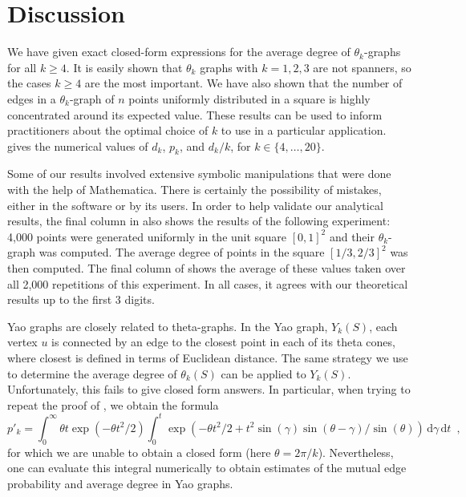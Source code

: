 \documentclass{patmorin}
\begin{document}
\section{Discussion}

We have given exact closed-form expressions for the average degree of
$\theta_k$-graphs for all $k\ge 4$.  It is easily shown that $\theta_k$
graphs with $k=1,2,3$ are not spanners, so the cases $k\ge 4$ are
the most important.  We have also shown that the number of edges in
a $\theta_k$-graph of $n$ points uniformly distributed in a square is
highly concentrated around its expected value.  These results can be
used to inform practitioners about the optimal choice of $k$ to use in
a particular application.   gives the numerical values
of $d_k$, $p_k$, and $d_k/k$, for $k\in\{4,\ldots,20\}$.


Some of our results involved extensive symbolic manipulations that were
done with the help of Mathematica.  There is certainly the possibility
of mistakes, either in the software or by its users.  In order to help
validate our analytical results, the final column in  also
shows the results of the following experiment: 4,000 points were generated
uniformly in the unit square $[0,1]^2$ and their $\theta_k$-graph was
computed.  The average degree of points in the square $[1/3,2/3]^2$ was
then computed.  The final column of  shows the average of
these values taken over all 2,000 repetitions of this experiment.  In all
cases, it agrees with our theoretical results up to the first 3 digits.

Yao graphs \cite{flinchbaugh.jones:strong,yao:on} are closely related to
theta-graphs.  In the Yao graph, $Y_k(S)$, each vertex $u$ is connected by
an edge to the closest point in each of its  theta cones, where closest
is defined in terms of Euclidean distance.  The same strategy we use to
determine the average degree of $\theta_k(S)$ can be applied to $Y_k(S)$.
Unfortunately, this fails to give closed form answers.  In particular,
when trying to repeat the proof of , we obtain the formula
\[
  p'_k = \int_0^\infty \theta t\exp(-\theta t^2/2) \int_0^t \exp(-\theta t^2/2+t^2\sin(\gamma)\sin(\theta-\gamma)/\sin(\theta))\,\mathrm d\gamma\, \mathrm dt \enspace ,
\]
for which we are unable to obtain a closed form (here $\theta=2\pi/k$).
Nevertheless, one can evaluate this integral numerically to obtain
estimates of the mutual edge probability and average degree in Yao graphs.
\end{document}
